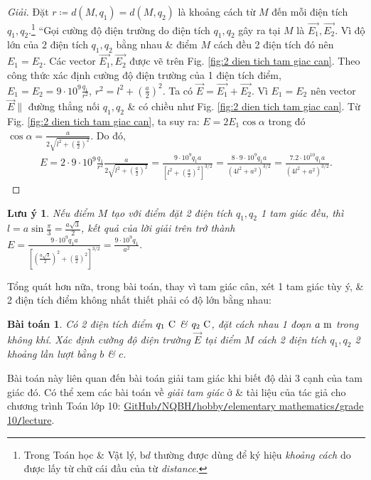 \documentclass[oneside]{book}
\numberwithin{equation}{section}
\newtheorem{baitoan}{Bài toán}[section]
\newtheorem{luuy}{Lưu ý}[section]
\begin{document}
\begin{proof}[Giải]
	Đặt $r\coloneqq d(M,q_1) = d(M,q_2)$ là khoảng cách từ $M$ đến mỗi điện tích $q_1,q_2$.\footnote{Trong Toán học \& Vật lý, b$d$ thường được dùng để ký hiệu \textit{khoảng cách} do được lấy từ chữ cái đầu của từ \textit{distance}.} ``Gọi cường độ điện trường do điện tích $q_1,q_2$ gây ra tại $M$ là $\overrightarrow{E_1},\overrightarrow{E_2}$. Vì độ lớn của 2 điện tích $q_1,q_2$ bằng nhau \& điểm $M$ cách đều 2 điện tích đó nên $E_1 = E_2$. Các vector $\overrightarrow{E_1},\overrightarrow{E_2}$ được vẽ trên Fig. \ref{fig:2 dien tich tam giac can}. Theo công thức xác định cường độ điện trường của 1 điện tích điểm, $E_1 = E_2 = 9\cdot 10^9\frac{q_1}{r^2}$, $r^2 = l^2 + \left(\frac{a}{2}\right)^2$. Ta có $\overrightarrow{E} = \overrightarrow{E_1} + \overrightarrow{E_2}$. Vì $E_1 = E_2$ nên vector $\overrightarrow{E}\parallel$ đường thẳng nối $q_1,q_2$ \& có chiều như Fig. \ref{fig:2 dien tich tam giac can}. Từ Fig. \ref{fig:2 dien tich tam giac can}, ta suy ra: $E = 2E_1\cos\alpha$ trong đó $\cos\alpha = \frac{a}{2\sqrt{l^2 + \left(\frac{a}{2}\right)^2}}$. Do đó,
	\begin{align*}
		E = 2\cdot 9\cdot 10^9\frac{q_1}{r^2}\frac{a}{2\sqrt{l^2 + \left(\frac{a}{2}\right)^2}} = \frac{9\cdot 10^9q_1a}{\left[l^2 + \left(\frac{a}{2}\right)^2\right]^{3/2}} = \frac{8\cdot 9\cdot 10^9q_1a}{(4l^2 + a^2)^{3/2}} = \frac{7.2\cdot 10^{10}q_1a}{(4l^2 + a^2)^{3/2}}.
	\end{align*}
\end{proof}

\begin{luuy}
	Nếu điểm $M$ tạo với điểm đặt 2 điện tích $q_1,q_2$ 1 tam giác đều, thì $l = a\sin\frac{\pi}{3} = \frac{a\sqrt{3}}{2}$, kết quả của lời giải trên trở thành $E = \frac{9\cdot 10^9q_1a}{\left[\left(\frac{a\sqrt{3}}{2}\right)^2 + \left(\frac{a}{2}\right)^2\right]^{3/2}} = \frac{9\cdot 10^9q_1}{a^2}$.
\end{luuy}
Tổng quát hơn nữa, trong bài toán, thay vì tam giác cân, xét 1 tam giác tùy ý, \& 2 điện tích điểm không nhất thiết phải có độ lớn bằng nhau:

\begin{baitoan}
	Có 2 điện tích điểm $q_1\ {\rm C}$ \& $q_2\ {\rm C}$, đặt cách nhau 1 đoạn $a\ {\rm m}$ trong không khí. Xác định cường độ điện trường $\overrightarrow{E}$ tại điểm $M$ cách 2 điện tích $q_1,q_2$ 2 khoảng lần lượt bằng $b$ \& $c$.
\end{baitoan}
Bài toán này liên quan đến bài toán giải tam giác khi biết độ dài 3 cạnh của tam giác đó. Có thể xem các bài toán về \textit{giải tam giác} ở \cite[\S2, pp. 71--78]{SGK_Toan_10_Canh_Dieu_tap_1} \& tài liệu của tác giả cho chương trình Toán lớp 10: \href{https://github.com/NQBH/hobby/blob/master/elementary_mathematics/grade_10/NQBH_elementary_mathematics_grade_10.pdf}{GitHub\texttt{/}NQBH\texttt{/}hobby\texttt{/}elementary mathematics\texttt{/}grade 10\texttt{/}lecture}.
\end{document}
